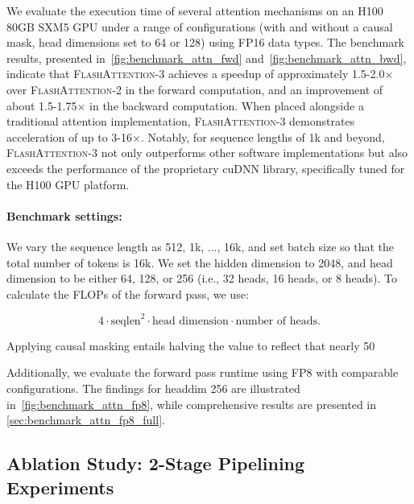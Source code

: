 \begin{enumerate}
\begin{algorithm}[H]
\begin{algorithmic}[1]
We evaluate the execution time of several attention mechanisms on an H100 80GB SXM5 GPU under a range of configurations (with and without a causal mask, head dimensions set to 64 or 128) using FP16 data types. The benchmark results, presented in~\cref{fig:benchmark_attn_fwd} and~\cref{fig:benchmark_attn_bwd}, indicate that \textsc{FlashAttention-3} achieves a speedup of approximately 1.5-2.0$\times$ over \textsc{FlashAttention-2} in the forward computation, and an improvement of about 1.5-1.75$\times$ in the backward computation. When placed alongside a traditional attention implementation, \textsc{FlashAttention-3} demonstrates acceleration of up to 3-16$\times$. Notably, for sequence lengths of 1k and beyond, \textsc{FlashAttention-3} not only outperforms other software implementations but also exceeds the performance of the proprietary cuDNN library, specifically tuned for the H100 GPU platform.

\paragraph{Benchmark settings:} We vary the sequence length as 512, 1k, ..., 16k, and set batch size so that the total number of tokens is 16k. We set the hidden dimension to 2048, and head dimension to be either 64, 128, or 256 (i.e., 32 heads, 16 heads, or 8 heads). To calculate the FLOPs of the forward pass, we use:

\begin{equation*}
  4 \cdot \text{seqlen}^2 \cdot \text{head dimension} \cdot \text{number of heads}.
\end{equation*}

Applying causal masking entails halving the value to reflect that nearly 50%

Additionally, we evaluate the forward pass runtime using FP8 with comparable configurations. The findings for headdim 256 are illustrated in~\cref{fig:benchmark_attn_fp8}, while comprehensive results are presented in \cref{sec:benchmark_attn_fp8_full}.

\subsection{Ablation Study: 2-Stage Pipelining Experiments}
\label{sec:2-stage-pipelining-experiments}


\end{algorithmic}
\end{algorithm}
\end{enumerate}
